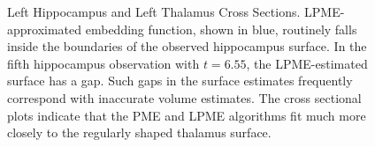 \documentclass[12pt]{article}
\theoremstyle{definition}
\begin{document}
\begin{figure}[h]
  \centering
  \vfill
  
  \caption{Left Hippocampus and Left Thalamus Cross Sections. LPME-approximated embedding function, shown in blue, routinely falls inside the boundaries of the observed hippocampus surface. In the fifth hippocampus observation with $t=6.55$, the LPME-estimated surface has a gap. Such gaps in the surface estimates frequently correspond with inaccurate volume estimates. The cross sectional plots indicate that the PME and LPME algorithms fit much more closely to the regularly shaped thalamus surface.}
  \label{fig:adni_cross_sections}
\end{figure}
\end{document}
